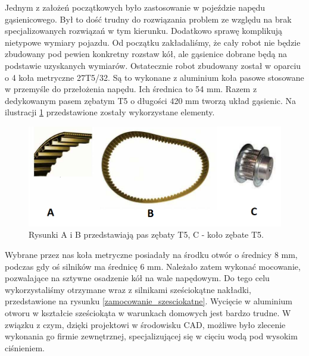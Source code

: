 Jednym z założeń początkowych było zastosowanie w pojeździe napędu gąsienicowego. Był to dość trudny do rozwiązania problem ze względu na brak specjalizowanych rozwiązań w tym kierunku. Dodatkowo sprawę komplikują nietypowe wymiary pojazdu. Od początku zakładaliśmy, że cały robot nie będzie zbudowany pod pewien konkretny rozstaw kół, ale gąsienice dobrane będą na podstawie uzyskanych wymiarów. Ostatecznie robot zbudowany został w oparciu o 4 koła metryczne 27T5/32. Są to wykonane z aluminium koła pasowe stosowane w przemyśle do przełożenia napędu. Ich średnica to 54 mm. Razem z dedykowanym pasem zębatym T5 o długości 420 mm tworzą układ gąsienic. Na ilustracji \ref{gasienice_elementy} przedstawione zostały wykorzystane elementy.

  \begin{figure}[H]
    \begin{center}
      \includegraphics[scale=0.5]{imgs/gasienice.png}
 	\caption[Elementy gąsienic.]{\small{Rysunki A i B przedstawiają pas zębaty T5, C - koło zębate T5. }\footnotemark}
	\label{gasienice_elementy}
    \end{center}
  \end{figure}

Wybrane przez nas koła metryczne posiadały na środku otwór o średnicy 8 mm, podczas gdy oś silników ma średnicę 6 mm. Należało zatem wykonać mocowanie, pozwalające na sztywne osadzenie kół na wale napędowym. Do tego celu wykorzystaliśmy otrzymane wraz z silnikami sześciokątne nakładki, przedstawione na rysunku \ref{zamocowanie_szesciokatne}. Wycięcie w aluminium otworu w kształcie sześciokąta w warunkach domowych jest bardzo trudne. W związku z czym, dzięki projektowi w środowisku CAD, możliwe było zlecenie wykonania go firmie zewnętrznej, specjalizującej się w cięciu wodą pod wysokim ciśnieniem.

